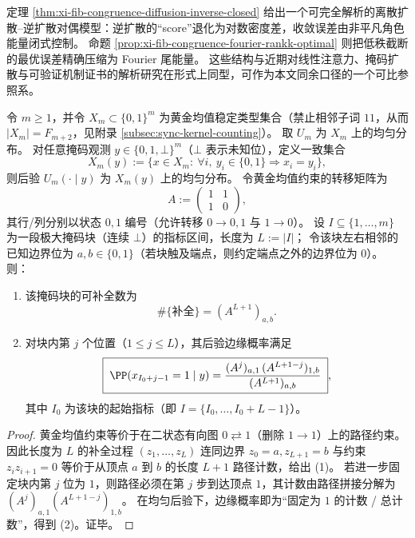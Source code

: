 \begin{remark}\label{rem:xi-fib-congruence-external-mirror-diffusion-attention}
定理 \ref{thm:xi-fib-congruence-diffusion-inverse-closed} 给出一个可完全解析的离散扩散--逆扩散对偶模型：逆扩散的“score”退化为对数密度差，收敛误差由非平凡角色能量闭式控制。
命题 \ref{prop:xi-fib-congruence-fourier-rankk-optimal} 则把低秩截断的最优误差精确压缩为 Fourier 尾能量。
这些结构与近期对线性注意力、掩码扩散与可验证机制证书的解析研究在形式上同型，可作为本文同余口径的一个可比参照系。\cite{LeeSohnLee2026LinearAttentionICLNoForgetting,LiangTanShroffLiang2026MaskedDiffusionSharpTV,HadadKatzBassan2026AutomatedCircuitDiscoveryProvable}
\end{remark}

\begin{theorem}[黄金均值稳定类型上的掩码后验计数与转移矩阵闭式]\label{thm:xi-masked-posterior-golden-mean-transfer-matrix}
令 \(m\ge 1\)，并令
\(
X_m\subset\{0,1\}^m
\)
为黄金均值稳定类型集合（禁止相邻子词 \(11\)，从而 \(|X_m|=F_{m+2}\)，见附录 \ref{subsec:sync-kernel-counting}）。
取 \(U_m\) 为 \(X_m\) 上的均匀分布。
对任意掩码观测 \(y\in\{0,1,\bot\}^m\)（\(\bot\) 表示未知位），定义一致集合
\[
X_m(y):=\{x\in X_m:\ \forall i,\ y_i\in\{0,1\}\Rightarrow x_i=y_i\},
\]
则后验 \(U_m(\cdot\mid y)\) 为 \(X_m(y)\) 上的均匀分布。
令黄金均值约束的转移矩阵为
\[
A:=
\begin{pmatrix}
1&1\\
1&0
\end{pmatrix},
\]
其行/列分别以状态 \(0,1\) 编号（允许转移 \(0\to 0,1\) 与 \(1\to 0\)）。
设 \(I\subseteq\{1,\dots,m\}\) 为一段极大掩码块（连续 \(\bot\)）的指标区间，长度为 \(L:=|I|\)；
令该块左右相邻的已知边界位为 \(a,b\in\{0,1\}\)（若块触及端点，则约定端点之外的边界位为 \(0\)）。
则：
\begin{enumerate}
  \item 该掩码块的可补全数为
  \[
  \#\{\text{补全}\}=(A^{L+1})_{a,b}.
  \]
  \item 对块内第 \(j\) 个位置（\(1\le j\le L\)），其后验边缘概率满足
  \[
  \boxed{\;
  \PP(x_{I_0+j-1}=1\mid y)=
  \frac{(A^{j})_{a,1}\,(A^{L+1-j})_{1,b}}{(A^{L+1})_{a,b}}\;},
  \]
  其中 \(I_0\) 为该块的起始指标（即 \(I=\{I_0,\dots,I_0+L-1\}\)）。
\end{enumerate}
\end{theorem}
\begin{proof}
黄金均值约束等价于在二状态有向图 \(0\rightleftarrows 1\)（删除 \(1\to 1\)）上的路径约束。
因此长度为 \(L\) 的补全过程 \((z_1,\dots,z_L)\) 连同边界 \(z_0=a,z_{L+1}=b\) 与约束 \(z_i z_{i+1}=0\) 等价于从顶点 \(a\) 到 \(b\) 的长度 \(L+1\) 路径计数，给出 (1)。
若进一步固定块内第 \(j\) 位为 \(1\)，则路径必须在第 \(j\) 步到达顶点 \(1\)，其计数由路径拼接分解为 \((A^{j})_{a,1}(A^{L+1-j})_{1,b}\)。
在均匀后验下，边缘概率即为“固定为 \(1\) 的计数 / 总计数”，得到 (2)。证毕。
\end{proof}


